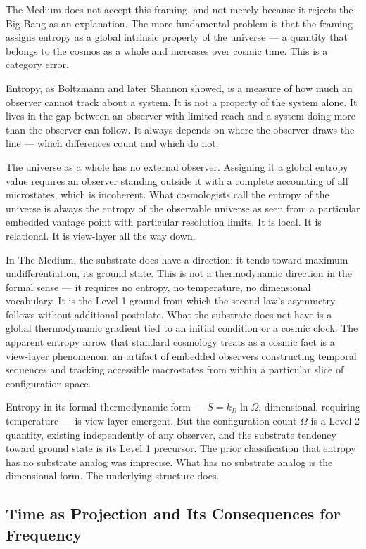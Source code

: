 \documentclass[11pt,letterpaper]{article}
\begin{document}
The Medium does not accept this framing, and not merely because it rejects the Big Bang as an explanation. The more fundamental problem is that the framing assigns entropy as a global intrinsic property of the universe --- a quantity that belongs to the cosmos as a whole and increases over cosmic time. This is a category error.

Entropy, as Boltzmann and later Shannon showed, is a measure of how much an observer cannot track about a system. It is not a property of the system alone. It lives in the gap between an observer with limited reach and a system doing more than the observer can follow. It always depends on where the observer draws the line --- which differences count and which do not.

The universe as a whole has no external observer. Assigning it a global entropy value requires an observer standing outside it with a complete accounting of all microstates, which is incoherent. What cosmologists call the entropy of the universe is always the entropy of the observable universe as seen from a particular embedded vantage point with particular resolution limits. It is local. It is relational. It is view-layer all the way down.

In The Medium, the substrate does have a direction: it tends toward maximum undifferentiation, its ground state. This is not a thermodynamic direction in the formal sense --- it requires no entropy, no temperature, no dimensional vocabulary. It is the Level 1 ground from which the second law's asymmetry follows without additional postulate. What the substrate does not have is a global thermodynamic gradient tied to an initial condition or a cosmic clock. The apparent entropy arrow that standard cosmology treats as a cosmic fact is a view-layer phenomenon: an artifact of embedded observers constructing temporal sequences and tracking accessible macrostates from within a particular slice of configuration space.

Entropy in its formal thermodynamic form --- \(S = k_B \ln\Omega\), dimensional, requiring temperature --- is view-layer emergent. But the configuration count \(\Omega\) is a Level 2 quantity, existing independently of any observer, and the substrate tendency toward ground state is its Level 1 precursor. The prior classification that entropy has no substrate analog was imprecise. What has no substrate analog is the dimensional form. The underlying structure does.

\subsection{Time as Projection and Its Consequences for Frequency}
\label{sec:org404e215}
\end{document}
